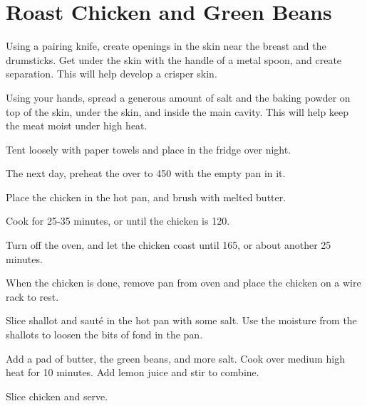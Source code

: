 \section{Roast Chicken and Green Beans}
\begin{recipe}



Using a pairing knife, create openings in the skin near the breast and the drumsticks. Get under the skin with the handle of a metal spoon, and create separation. This will help develop a crisper skin.

Using your hands, spread a generous amount of salt and the baking powder on top of the skin, under the skin, and inside the main cavity. This will help keep the meat moist under high heat.

Tent loosely with paper towels and place in the fridge over night.

The next day, preheat the over to 450\degree{} with the empty pan in it. 


Place the chicken in the hot pan, and brush with melted butter. 

Cook for 25-35 minutes, or until the chicken is 120\degree{}. 

Turn off the oven, and let the chicken coast until 165\degree{}, or about another 25 minutes. 


When the chicken is done, remove pan from oven and place the chicken on a wire rack to rest.

Slice shallot and sauté in the hot pan with some salt. Use the moisture from the shallots to loosen the bits of fond in the pan.

Add a pad of butter, the green beans, and more salt. Cook over medium high heat for 10 minutes. Add lemon juice and stir to combine.

Slice chicken and serve.

\end{recipe}
